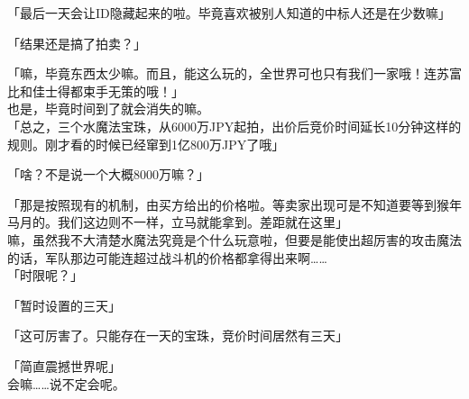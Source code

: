 「最后一天会让ID隐藏起来的啦。毕竟喜欢被别人知道的中标人还是在少数嘛」

「结果还是搞了拍卖？」

「嘛，毕竟东西太少嘛。而且，能这么玩的，全世界可也只有我们一家哦！连苏富比和佳士得都束手无策的哦！」\\

也是，毕竟时间到了就会消失的嘛。\\

「总之，三个水魔法宝珠，从6000万JPY起拍，出价后竞价时间延长10分钟这样的规则。刚才看的时候已经窜到1亿800万JPY了哦」

「啥？不是说一个大概8000万嘛？」

「那是按照现有的机制，由买方给出的价格啦。等卖家出现可是不知道要等到猴年马月的。我们这边则不一样，立马就能拿到。差距就在这里」\\

嘛，虽然我不大清楚水魔法究竟是个什么玩意啦，但要是能使出超厉害的攻击魔法的话，军队那边可能连超过战斗机的价格都拿得出来啊……\\

「时限呢？」

「暂时设置的三天」

「这可厉害了。只能存在一天的宝珠，竞价时间居然有三天」

「简直震撼世界呢」\\

会嘛……说不定会呢。\\

